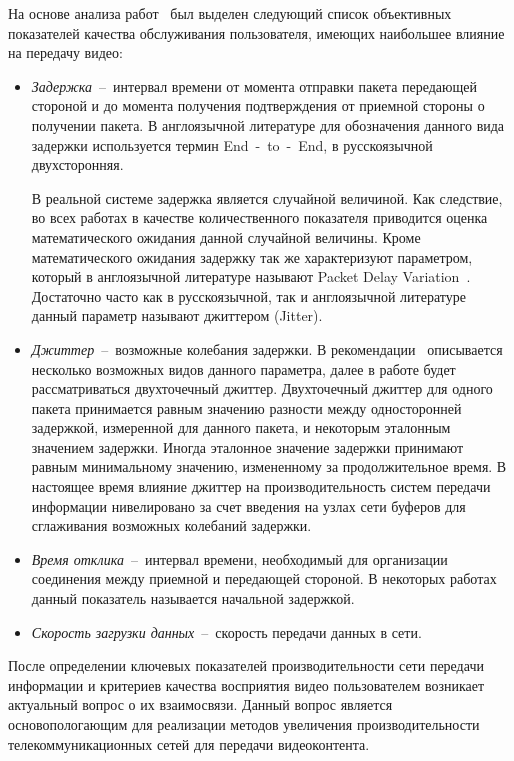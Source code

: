 На основе анализа работ~\cite{Chen,Cacheda2007,HuaweiReport} был выделен следующий список объективных показателей качества обслуживания пользователя, имеющих наибольшее влияние на передачу видео:
\begin{itemize}
  \item \textit{Задержка}~--~интервал времени от момента отправки пакета передающей стороной и до момента получения подтверждения от приемной стороны о получении пакета. В англоязычной литературе для обозначения данного вида задержки используется термин End~-~to~-~End, в русскоязычной двухсторонняя.

  В реальной системе задержка является случайной величиной. Как следствие, во всех работах в качестве количественного показателя приводится оценка математического ожидания данной случайной величины. Кроме математического ожидания задержку так же характеризуют параметром, который в англоязычной литературе называют Packet Delay Variation~\cite{Jitter}. Достаточно часто как в русскоязычной, так и англоязычной литературе данный параметр называют джиттером (Jitter).
  \item \textit{Джиттер}~--~возможные колебания задержки. В рекомендации~\cite{Jitter} описывается несколько возможных видов данного параметра, далее в работе будет рассматриваться двухточечный джиттер. Двухточечный джиттер для одного пакета принимается равным значению разности между односторонней задержкой, измеренной для данного пакета, и некоторым эталонным значением задержки. Иногда эталонное значение задержки принимают равным минимальному значению, измененному за продолжительное время. В настоящее время влияние джиттер на производительность систем передачи информации нивелировано за счет введения на узлах сети буферов для сглаживания возможных колебаний задержки.
  \item \textit{Время отклика}~--~интервал времени, необходимый для организации соединения между приемной и передающей стороной. В некоторых работах данный показатель называется начальной задержкой.
  \item \textit{Скорость загрузки данных}~--~скорость передачи данных в сети.
\end{itemize}

После определении ключевых показателей производительности сети передачи информации и критериев качества восприятия видео пользователем возникает актуальный вопрос о их взаимосвязи. Данный вопрос является основопологающим для реализации методов увеличения производительности телекоммуникационных сетей для передачи видеоконтента.

